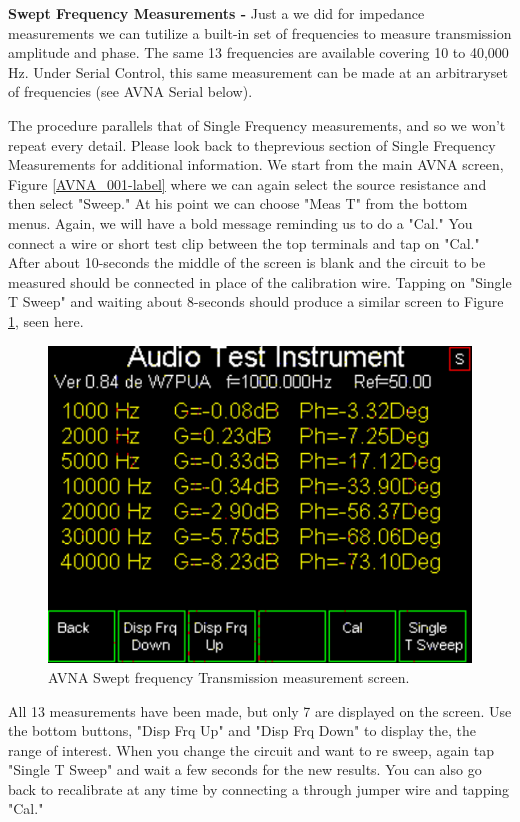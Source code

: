 \textbf{Swept Frequency Measurements - } Just a we did for impedance measurements we can tutilize a built-in set of frequencies to measure transmission amplitude and phase.  The same 13 frequencies are available covering 10 to 40,000 Hz.  Under Serial Control, this same measurement can be made at an arbitraryset of frequencies (see AVNA Serial below).

The procedure parallels that of Single Frequency measurements, and so we won't repeat every detail.  Please look back to theprevious section of Single Frequency Measurements  for additional information.  We start from the main AVNA screen, Figure \ref{AVNA_001-label} where we can again select the source resistance and then select "Sweep."  At his point we can choose "Meas T" from the bottom menus.  Again, we will have a bold message reminding us to do a "Cal."  You connect a wire or short test clip between the top terminals and tap on "Cal."  After  about 10-seconds the middle of the screen is  blank and the circuit to be measured  should be connected in place of the calibration wire.  Tapping on "Single T Sweep" and waiting about 8-seconds should produce a similar screen to Figure  \ref{AVNA_032-label}, seen here.
\begin{figure}[H]
\begin{center}
\includegraphics[scale=0.75]{./images/AVNA_032.pdf}
\caption{AVNA Swept frequency Transmission measurement screen.}
\label{AVNA_032-label}
\end{center}
\end{figure}
%
All 13 measurements have been made, but only 7 are displayed on the screen.  Use the bottom buttons, "Disp Frq Up" and "Disp Frq Down" to display the, the range of interest.  When you change the circuit and want to re sweep, again tap "Single T Sweep" and wait a few seconds for the new results.  You can also go back to recalibrate at any time by connecting a through jumper wire and tapping "Cal."

